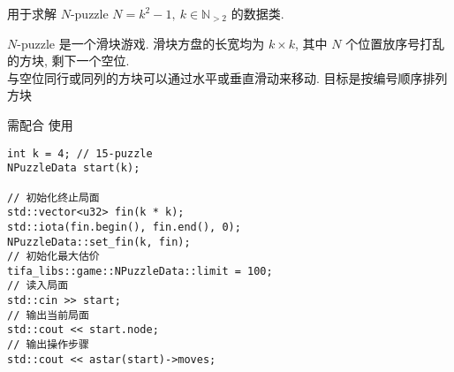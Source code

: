 用于求解 \(N\)-puzzle \(N=k^2-1,~k\in\mathbb{N}_{>2}\) 的数据类.

\(N\)-puzzle 是一个滑块游戏. 滑块方盘的长宽均为 \(k\times k\), 其中 \(N\) 个位置放序号打乱的方块, 剩下一个空位. \\ 与空位同行或同列的方块可以通过水平或垂直滑动来移动. 目标是按编号顺序排列方块

需配合  使用

\begin{verbatim}
int k = 4; // 15-puzzle
NPuzzleData start(k);

// 初始化终止局面
std::vector<u32> fin(k * k);
std::iota(fin.begin(), fin.end(), 0);
NPuzzleData::set_fin(k, fin);
// 初始化最大估价
tifa_libs::game::NPuzzleData::limit = 100;
// 读入局面
std::cin >> start;
// 输出当前局面
std::cout << start.node;
// 输出操作步骤
std::cout << astar(start)->moves;
\end{verbatim}
